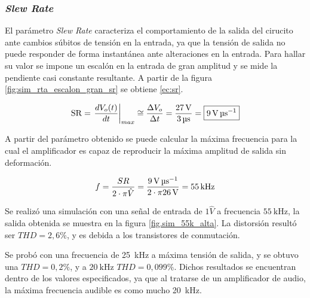 \subsubsection{\textit{Slew Rate}}



	El parámetro \textit{Slew Rate} caracteriza el comportamiento de la salida del cirucito ante cambios súbitos de tensión en la entrada, ya que la tensión de salida no puede responder de forma instantánea ante alteraciones en la entrada. Para hallar su valor se impone un escalón en la entrada de gran amplitud y se mide la pendiente casi constante resultante. A partir de la figura \ref{fig:sim_rta_escalon_gran_sr} se obtiene \eqref{ec:sr}.

	\begin{equation}
	\centering
	\mathrm{SR} = \left. \frac{dV_o(t)}{dt} \right\rvert_{max} \cong \frac{\Delta V_o}{\Delta t} = \frac{\SI{27}{\volt}}{\SI{3}{\micro\second}} = \boxed{\SI{9}{\volt\per\micro\second}}
	\label{ec:sr}
\end{equation}


A partir del parámetro obtenido se puede calcular la máxima frecuencia para la cual el amplificador es capaz de reproducir la máxima amplitud de salida sin deformación.

\begin{equation}
	\centering
	f = \frac{SR}{2 \cdot \pi \hat{V} } = \frac{\SI{9}{\volt\per\micro\second}}{2 \cdot \pi \SI{26}{\volt}} = \SI{55}{\kilo\hertz}
	\label{ec.max_f}
\end{equation}

Se realizó una simulación con una señal de entrada de $1 \hat{V}$ a frecuencia $\SI{55}{\kilo\hertz}$, la salida obtenida se muestra en la figura \ref{fig.sim_55k_alta}. La distorsión resultó ser $THD = 2,6\%$, y es debida a los transistores de conmutación. 


Se probó con una frecuencia de \SI{25}{\kilo\hertz} a máxima tensión de salida, y se obtuvo una $THD=0,2\%$, y a $\SI{20}{\kilo\hertz}$ $THD=0,099\%$. Dichos resultados se encuentran dentro de los valores especificados, ya que al tratarse de un amplificador de audio, la máxima frecuencia audible es como mucho \SI{20}{\kilo\hertz}.

